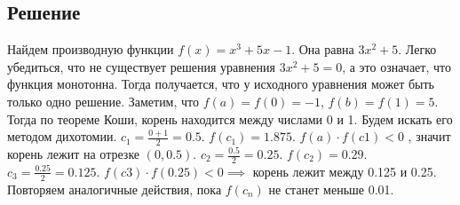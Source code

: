 \subsection*{Решение}
Найдем производную функции $f(x) = x^{3} + 5x - 1$. Она равна $3x^{2}+5$. Легко
убедиться, что не существует решения уравнения $3x^{2}+5=0$, а это означает, что
функция монотонна. Тогда получается, что у исходного уравнения может быть только
одно решение. Заметим, что $f(a) = f(0) = -1$, $f(b) = f(1) = 5$. Тогда по теореме Коши,
корень находится между числами 0 и 1. Будем искать его методом дихотомии.
$c_{1} = \frac{0+1}{2} = 0.5 $. $f(c_{1}) = 1.875$. $f(a)\cdot f(c1) < 0 $ , значит
корень лежит на отрезке $(0,0.5)$. $c_{2} = \frac{0.5}{2} = 0.25$. $f(c_{2}) = 0.29$.
$c_{3} = \frac{0.25}{2} = 0.125$. $f(c3)\cdot f(0.25) < 0 \implies $ корень лежит
между 0.125 и 0.25. Повторяем аналогичные действия, пока $f(c_{n})$ не станет меньше
0.01.
